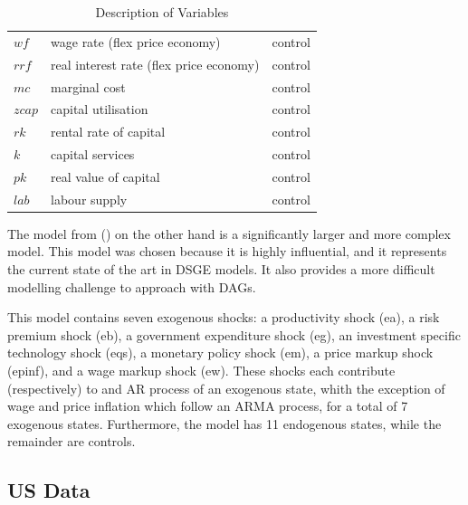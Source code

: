 \documentclass{article}
\begin{document}
\begin{table}
\begin{tabular}{|l|l|l|}
    $wf$ & wage rate (flex price economy) & control \\
    $rrf$ & real interest rate (flex price economy) & control \\
    $mc$ & marginal cost & control \\
    $zcap$ & capital utilisation & control \\
    $rk$ & rental rate of capital & control \\
    $k$ & capital services & control \\
    $pk$ & real value of capital & control \\
    $lab$ & labour supply & control \\ \cline{2-2}
    \hline
  \end{tabular}
  \caption{Description of Variables}
  \label{tab1}
\end{table}

The model from \citeauthor{smets2007shocks} (\citeyear{smets2007shocks}) on the other hand is a significantly larger and more complex model. This model was chosen because it is highly influential, and it represents the current state of the art in DSGE models. It also provides a more difficult modelling challenge to approach with DAGs. 

This model contains seven exogenous shocks: a productivity shock (ea), a risk premium shock (eb), a government expenditure shock (eg), an investment specific technology shock (eqs), a monetary policy shock (em), a price markup shock (epinf), and a wage markup shock (ew). These shocks each contribute (respectively) to and AR process of an exogenous state, whith the exception of wage and price inflation which follow an ARMA process, for a total of 7 exogenous states. Furthermore, the model has 11 endogenous states, while the remainder are controls.

\subsection{US Data}
\end{document}
